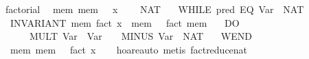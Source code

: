 \documentclass{llncs}
\begin{document}
\begin{isabellebody}
\isanewline
{}\isamarkupfalse%
\ factorial{}\isanewline
\ \ {}{}{}mem{}\ mem\ {}\ {}\ x{}{}\isanewline
\ \ {}\ {}{}\ NAT\ {}{}\isanewline
\ \ {}WHILE\ {}{}pred\ {}EQ\ {}Var\ {}{}\ {}NAT\ {}{}{}{}\isanewline
\ \ INVARIANT\ {}mem{}\ fact\ x\ {}\ mem\ {}\ {}\ fact\ {}mem\ {}{}{}\isanewline
\ \ DO\isanewline
\ \ \ \ {}\ {}{}\ MULT\ {}Var\ {}{}\ {}Var\ {}{}{}\ {}\ {}{}\ MINUS\ {}Var\ {}{}\ {}NAT\ {}{}\isanewline
\ \ WEND{}\isanewline
\ \ {}{}mem{}\ mem\ {}\ {}\ fact\ x{}{}{}\isanewline
%
\isadelimproof
\ \ %
\endisadelimproof
%
\isatagproof
{}\isamarkupfalse%
\ hoare{}auto\ {}metis\ fact{}reduce{}nat{}%
\endisatagproof\isanewline
\end{isabellebody}
\end{document}
